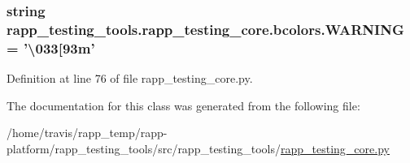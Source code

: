 \hypertarget{classrapp__testing__tools_1_1rapp__testing__core_1_1bcolors_a38d3b531ddaa4c1a23d0482ce019e9ec}{
\subsubsection[{W\-A\-R\-N\-I\-N\-G}]{\setlength{\rightskip}{0pt plus 5cm}string rapp\-\_\-testing\-\_\-tools.\-rapp\-\_\-testing\-\_\-core.\-bcolors.\-W\-A\-R\-N\-I\-N\-G = '\textbackslash{}033\mbox{[}93m'\hspace{0.3cm}{\ttfamily [static]}}}\label{classrapp__testing__tools_1_1rapp__testing__core_1_1bcolors_a38d3b531ddaa4c1a23d0482ce019e9ec}


Definition at line 76 of file rapp\-\_\-testing\-\_\-core.\-py.



The documentation for this class was generated from the following file\-:\begin{DoxyCompactItemize}
\item 
/home/travis/rapp\-\_\-temp/rapp-\/platform/rapp\-\_\-testing\-\_\-tools/src/rapp\-\_\-testing\-\_\-tools/\hyperlink{rapp__testing__core_8py}{rapp\-\_\-testing\-\_\-core.\-py}\end{DoxyCompactItemize}
